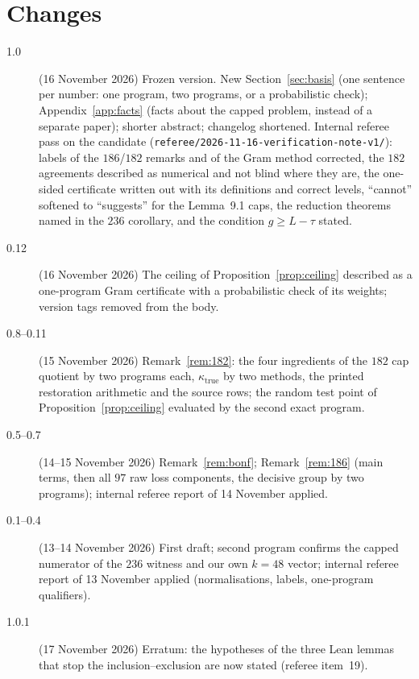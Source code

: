 \documentclass[11pt]{amsart}
\theoremstyle{definition}
\theoremstyle{remark}
\begin{document}
\section*{Changes}
\begin{description}
\item[1.0] (16 November 2026) Frozen version. New Section~\ref{sec:basis}
(one sentence per number: one program, two programs, or a probabilistic
check); Appendix~\ref{app:facts} (facts about the capped problem, instead of a
separate paper); shorter abstract; changelog shortened. Internal referee pass on
the candidate (\texttt{referee/}\allowbreak\texttt{2026-11-16-verification-note-v1/}):
labels of the $186$/$182$ remarks and of the Gram method corrected, the
$182$ agreements described as numerical and not blind where they are, the
one-sided certificate written out with its definitions and correct levels,
``cannot'' softened to ``suggests'' for the Lemma~9.1 caps, the reduction
theorems named in the $236$ corollary, and the condition $g\ge L-\tau$ stated.
\item[0.12] (16 November 2026) The ceiling of Proposition~\ref{prop:ceiling}
described as a one-program Gram certificate with a probabilistic check of its
weights; version tags removed from the body.
\item[0.8--0.11] (15 November 2026) Remark~\ref{rem:182}: the four ingredients of
the $182$ cap quotient by two programs each, $\kappa_{\mathrm{true}}$ by two
methods, the printed restoration arithmetic and the source rows; the random
test point of Proposition~\ref{prop:ceiling} evaluated by the second exact program.
\item[0.5--0.7] (14--15 November 2026) Remark~\ref{rem:bonf}; Remark~\ref{rem:186}
(main terms, then all $97$ raw loss components, the decisive group by two
programs); internal referee report of 14 November applied.
\item[0.1--0.4] (13--14 November 2026) First draft; second program confirms the
capped numerator of the $236$ witness and our own $k=48$ vector; internal
referee report of 13 November applied (normalisations, labels, one-program
qualifiers).
\item[1.0.1] (17 November 2026) Erratum: the hypotheses of the three Lean
lemmas that stop the inclusion--exclusion are now stated (referee item~19).
\end{description}
\end{document}

